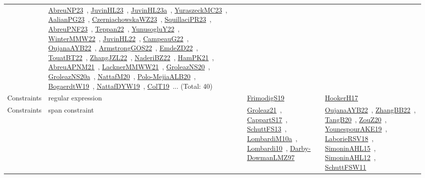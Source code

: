{\begin{longtable}{lp{3cm}>{\raggedright\arraybackslash}p{6cm}>{\raggedright\arraybackslash}p{6cm}>{\raggedright\arraybackslash}p{8cm}}
& \href{works/AbreuNP23.pdf}{AbreuNP23}~\cite{AbreuNP23}, \href{works/JuvinHL23.pdf}{JuvinHL23}~\cite{JuvinHL23}, \href{works/JuvinHL23a.pdf}{JuvinHL23a}~\cite{JuvinHL23a}, \href{works/YuraszeckMC23.pdf}{YuraszeckMC23}~\cite{YuraszeckMC23}, \href{works/AalianPG23.pdf}{AalianPG23}~\cite{AalianPG23}, \href{works/CzerniachowskaWZ23.pdf}{CzerniachowskaWZ23}~\cite{CzerniachowskaWZ23}, \href{works/SquillaciPR23.pdf}{SquillaciPR23}~\cite{SquillaciPR23}, \href{works/AbreuPNF23.pdf}{AbreuPNF23}~\cite{AbreuPNF23}, \href{works/Teppan22.pdf}{Teppan22}~\cite{Teppan22}, \href{works/YunusogluY22.pdf}{YunusogluY22}~\cite{YunusogluY22}, \href{works/WinterMMW22.pdf}{WinterMMW22}~\cite{WinterMMW22}, \href{works/JuvinHL22.pdf}{JuvinHL22}~\cite{JuvinHL22}, \href{works/CampeauG22.pdf}{CampeauG22}~\cite{CampeauG22}, \href{works/OujanaAYB22.pdf}{OujanaAYB22}~\cite{OujanaAYB22}, \href{works/ArmstrongGOS22.pdf}{ArmstrongGOS22}~\cite{ArmstrongGOS22}, \href{works/EmdeZD22.pdf}{EmdeZD22}~\cite{EmdeZD22}, \href{works/TouatBT22.pdf}{TouatBT22}~\cite{TouatBT22}, \href{works/ZhangJZL22.pdf}{ZhangJZL22}~\cite{ZhangJZL22}, \href{works/NaderiBZ22.pdf}{NaderiBZ22}~\cite{NaderiBZ22}, \href{works/HamPK21.pdf}{HamPK21}~\cite{HamPK21}, \href{works/AbreuAPNM21.pdf}{AbreuAPNM21}~\cite{AbreuAPNM21}, \href{works/LacknerMMWW21.pdf}{LacknerMMWW21}~\cite{LacknerMMWW21}, \href{works/GroleazNS20.pdf}{GroleazNS20}~\cite{GroleazNS20}, \href{works/GroleazNS20a.pdf}{GroleazNS20a}~\cite{GroleazNS20a}, \href{works/NattafM20.pdf}{NattafM20}~\cite{NattafM20}, \href{works/Polo-MejiaALB20.pdf}{Polo-MejiaALB20}~\cite{Polo-MejiaALB20}, \href{works/BogaerdtW19.pdf}{BogaerdtW19}~\cite{BogaerdtW19}, \href{works/NattafDYW19.pdf}{NattafDYW19}~\cite{NattafDYW19}, \href{works/ColT19.pdf}{ColT19}~\cite{ColT19}... (Total: 40)\\
Constraints & regular expression &  & \href{works/FrimodigS19.pdf}{FrimodigS19}~\cite{FrimodigS19} & \href{works/HookerH17.pdf}{HookerH17}~\cite{HookerH17}\\
Constraints & span constraint &  & \href{works/Groleaz21.pdf}{Groleaz21}~\cite{Groleaz21}, \href{works/CappartS17.pdf}{CappartS17}~\cite{CappartS17}, \href{works/SchuttFS13.pdf}{SchuttFS13}~\cite{SchuttFS13}, \href{works/LombardiM10a.pdf}{LombardiM10a}~\cite{LombardiM10a}, \href{works/Lombardi10.pdf}{Lombardi10}~\cite{Lombardi10}, \href{works/Darby-DowmanLMZ97.pdf}{Darby-DowmanLMZ97}~\cite{Darby-DowmanLMZ97} & \href{works/OujanaAYB22.pdf}{OujanaAYB22}~\cite{OujanaAYB22}, \href{works/ZhangBB22.pdf}{ZhangBB22}~\cite{ZhangBB22}, \href{works/TangB20.pdf}{TangB20}~\cite{TangB20}, \href{works/ZouZ20.pdf}{ZouZ20}~\cite{ZouZ20}, \href{works/YounespourAKE19.pdf}{YounespourAKE19}~\cite{YounespourAKE19}, \href{works/LaborieRSV18.pdf}{LaborieRSV18}~\cite{LaborieRSV18}, \href{works/SimoninAHL15.pdf}{SimoninAHL15}~\cite{SimoninAHL15}, \href{works/SimoninAHL12.pdf}{SimoninAHL12}~\cite{SimoninAHL12}, \href{works/SchuttFSW11.pdf}{SchuttFSW11}~\cite{SchuttFSW11}\\

\end{longtable}}
